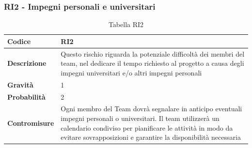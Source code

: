 \documentclass{article}
\begin{document}
    \subsubsection{RI2 - Impegni personali e universitari }
    \begin{table}[h]
        \renewcommand{\arraystretch}{1.5}
        \centering
        \begin{tabular}{|p{3cm}|p{11cm}|}
            \hline
            \textbf{Codice} & RI2 \\
            \hline
            \textbf{Descrizione} & Questo rischio riguarda la potenziale difficoltà dei membri del team, nel dedicare il tempo richiesto al progetto a causa degli impegni universitari e/o altri impegni personali \\
            \hline
            \textbf{Gravità} & 1 \\
            \hline
            \textbf{Probabilità} & 2 \\
            \hline
            \textbf{Contromisure} & Ogni membro del Team dovrà segnalare in anticipo eventuali impegni personali o universitari. Il team utilizzerà un calendario condiviso per pianificare le attività in modo da evitare sovrapposizioni e garantire la disponibilità necessaria \\
            \hline
        \end{tabular}
        \caption{Tabella RI2}
    \end{table}

    \break
\end{document}
